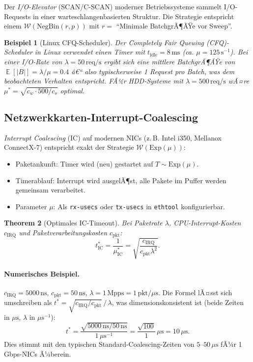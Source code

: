 ﻿\documentclass[12pt, a4paper]{article}
\newtheorem{theorem}{Theorem}[section]
\newtheorem{example}[theorem]{Beispiel}
\DeclareMathOperator{\E}{\mathbb{E}}
\newcommand{\Exp}{\mathrm{Exp}}
\newcommand{\NBin}{\mathrm{NegBin}}
\begin{document}
Der \emph{I/O-Elevator} (SCAN/C-SCAN) moderner Betriebssysteme sammelt I/O-Requests
in einer warteschlangenbasierten Struktur. Die Strategie entspricht einem
$\mathcal{W}(\NBin(r, p))$ mit $r = $ ``Minimale BatchgrÃ¶ÃŸe vor Sweep''.

\begin{example}[Linux CFQ-Scheduler]\label{ex:cfq}
Der \emph{Completely Fair Queuing (CFQ)}-Scheduler in Linux verwendet einen
Timer mit $t_{\mathrm{idle}} = 8\,\mathrm{ms}$ (ca. $\mu = 125\,\mathrm{s}^{-1}$).
Bei einer I/O-Rate von $\lambda = 50\,\mathrm{req/s}$ ergibt sich eine
mittlere BatchgrÃ¶ÃŸe von $\E[|B|] = \lambda/\mu = 0.4$ â€“ also typischerweise
1 Request pro Batch, was dem beobachteten Verhalten entspricht. FÃ¼r
HDD-Systeme mit $\lambda = 500\,\mathrm{req/s}$ wÃ¤re
$\mu^* = \sqrt{c_w \cdot 500/c_s}$ optimal.
\end{example}

\subsection{Netzwerkkarten-Interrupt-Coalescing}

\emph{Interrupt Coalescing} (IC) auf modernen NICs (z.\,B. Intel i350, Mellanox
ConnectX-7) entspricht exakt der Strategie $\mathcal{W}(\Exp(\mu))$:
\begin{itemize}[noitemsep]
  \item Paketankunft: Timer wird (neu) gestartet auf $T \sim \Exp(\mu)$.
  \item Timerablauf: Interrupt wird ausgelÃ¶st, alle Pakete im Puffer werden
        gemeinsam verarbeitet.
  \item Parameter $\mu$: Als \texttt{rx-usecs} oder \texttt{tx-usecs} in
        \texttt{ethtool} konfigurierbar.
\end{itemize}

\begin{theorem}[Optimales IC-Timeout]\label{thm:nictimeout}
Bei Paketrate $\lambda$, CPU-Interrupt-Kosten $c_{\mathrm{IRQ}}$ und
Paketverarbeitungskosten $c_{\mathrm{pkt}}$:
\[
  t^*_{\mathrm{IC}} = \frac{1}{\mu^*_{\mathrm{IC}}} =
  \sqrt{\frac{c_{\mathrm{IRQ}}}{c_{\mathrm{pkt}} \lambda^2}}.
\]
\end{theorem}

\paragraph{Numerisches Beispiel.}
$c_{\mathrm{IRQ}} = 5000\,\mathrm{ns}$, $c_{\mathrm{pkt}} = 50\,\mathrm{ns}$,
$\lambda = 1\,\mathrm{Mpps} = 1\,\mathrm{pkt}/\mu\mathrm{s}$.
Die Formel lÃ¤sst sich umschreiben als
$t^* = \sqrt{c_{\mathrm{IRQ}}/c_{\mathrm{pkt}}}\,/\,\lambda$, was
dimensionskonsistent ist (beide Zeiten in $\mu\mathrm{s}$,
$\lambda$ in $\mu\mathrm{s}^{-1}$):
\[
  t^* = \frac{\sqrt{5000\,\mathrm{ns}/50\,\mathrm{ns}}}{1\,\mu\mathrm{s}^{-1}}
      = \frac{\sqrt{100}}{1}\,\mu\mathrm{s}
      = 10\,\mu\mathrm{s}.
\]
Dies stimmt mit den typischen Standard-Coalescing-Zeiten von
$5$--$50\,\mu\mathrm{s}$ fÃ¼r 1\,Gbps-NICs Ã¼berein.
\end{document}

